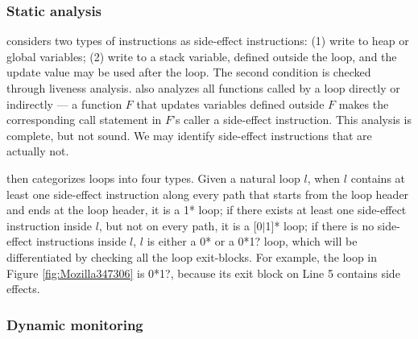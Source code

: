 
\subsubsection{Static analysis}
\label{sec:s_workless}

\Tool considers two types of instructions as side-effect instructions:
(1) write to heap or global variables;
(2) write to a stack variable, defined outside the loop, and the update value
may be used after the loop. The second condition is checked through liveness
analysis.
\Tool also analyzes all functions called
by a loop directly or indirectly --- a function $F$ that updates variables
defined outside $F$ makes the corresponding call statement in $F$'s
caller a side-effect instruction.
This analysis is complete, but not sound. We may identify side-effect
instructions that are actually not. %

\Tool then categorizes loops into four types.
Given a natural loop $l$, when $l$
contains at least one side-effect instruction along every path that
starts from the loop header and ends at the loop header, it is a 1* loop;
if there exists at least one side-effect instruction inside $l$, but not on
every path,
it is a [0$|$1]* loop; if there is no side-effect instructions inside $l$,
$l$ is either a 0* or a 0*1? loop, which will be differentiated by checking
all the loop exit-blocks.
For example, the loop in Figure \ref{fig:Mozilla347306} is 0*1?, because 
its exit block on Line 5 contains side effects.


\subsubsection{Dynamic monitoring}
\label{sec:d_workless}


